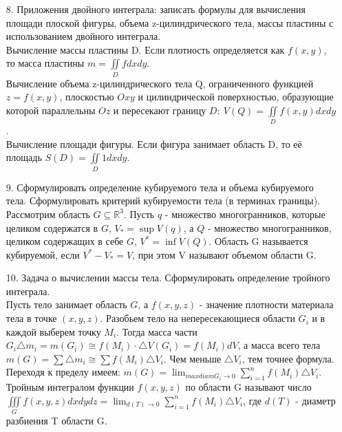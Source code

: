 \documentclass[a4paper]{article}
\begin{document}
\begin{enumerate}
\item[8.] Приложения двойного интеграла: записать формулы для вычисления площади плоской фигуры, объема z-цилиндрического тела, массы пластины с использованием двойного интеграла. \\

Вычисление массы пластины D. Если плотность определяется как $f(x,y)$, то масса пластины $\displaystyle  m = \iint\limits_D f dxdy$. \\
Вычисление объема z-цилиндрического тела Q, ограниченного функцией $z = f(x,y)$, плоскостью $Oxy$ и цилиндрической поверхностью, образующие которой параллельны $Oz$ и пересекают границу $\displaystyle  D: \ V(Q) = \iint\limits_D f(x,y) dxdy$. \\
Вычисление площади фигуры. Если фигура занимает область D, то её площадь $\displaystyle  S(D) = \iint\limits_D 1 dxdy$. \\


\item[9.] Сформулировать определение кубируемого тела и объема кубируемого тела. Сформулировать критерий кубируемости тела (в терминах границы). \\

Рассмотрим область $G \subseteq \mathbb{R}^3$. Пусть $q$ - множество многогранников, которые целиком содержатся в $G$, $V_* = \sup{V(q)}$, а $Q$ - множество многогранников, целиком содержащих в себе $G$, $V^* = \inf{V(Q)}$. Область G называется кубируемой, если $V^* - V_* = V$, при этом V называют объемом области G. \\


\item[10.] Задача о вычислении массы тела. Сформулировать определение тройного интеграла. \\

Пусть тело занимает область $G$, а $f(x,y,z)$ - значение плотности материала тела в точке $(x,y,z)$. Разобьем тело на непересекающиеся области $G_i$ и в каждой выберем точку $M_i$. Тогда масса части $G_i \triangle m_i = m(G_i) \cong f(M_i) \cdot \triangle V(G_i) = f(M_i) dV$, а масса всего тела $m(G) = \sum \triangle m_i \cong \sum f(M_i) \triangle V_i$. Чем меньше $\triangle V_i$, тем точнее формула. Переходя к пределу имеем: $m(G) = \lim_{max diam G_i \to 0} \sum\limits_{i = 1}^{n} f(M_i) \triangle V_i$. \\
Тройным интегралом функции $f(x,y,z)$ по области G называют число $\displaystyle  \iiint\limits_G f(x,y,z) dxdydz = \lim_{d(T) \to 0} \sum\limits_{i = 1}^{n} f(M_i) \triangle V_i$, где $d(T)$ - диаметр разбиения T области G. \\



\end{enumerate}
\end{document}
